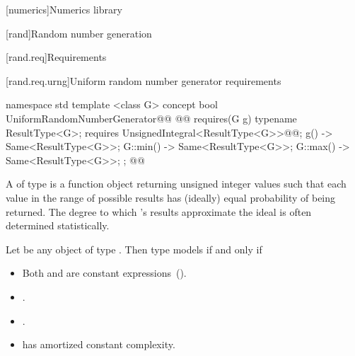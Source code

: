 [numerics]{Numerics library}

\setcounter{section}{4}
[rand]{Random number generation}

[rand.req]{Requirements}


\setcounter{subsubsection}{2}
[rand.req.urng]{Uniform random number generator requirements}%
%

\begin{addedblock}
\begin{codeblock}
namespace std {
  template <class G>
  concept bool UniformRandomNumberGenerator@\newtxt{() \{}\oldtxt{ =}@
    @@ requires(G g) {
      typename ResultType<G>;
      requires UnsignedIntegral<ResultType<G>>@\newtxt{()}@;
      { g() } -> Same<ResultType<G>>;
      { G::min() } -> Same<ResultType<G>>;
      { G::max() } -> Same<ResultType<G>>;
    };
  @\newtxt{\}}@
}
\end{codeblock}
\end{addedblock}

\pnum
A 
 of type 
is a function object
returning unsigned integer values
such that each value
in the range of possible results
has (ideally) equal probability
of being returned.
\enternote
 The degree to which 's results
 approximate the ideal
 is often determined statistically.
\exitnote


\begin{addedblock}
\pnum
Let  be any object of type . Then type  models
 if and only if

\begin{itemize}
\item Both  and  are constant expressions~().
\item {}.
\item {}.
\item {} has amortized constant complexity.
\end{itemize}

\end{addedblock}